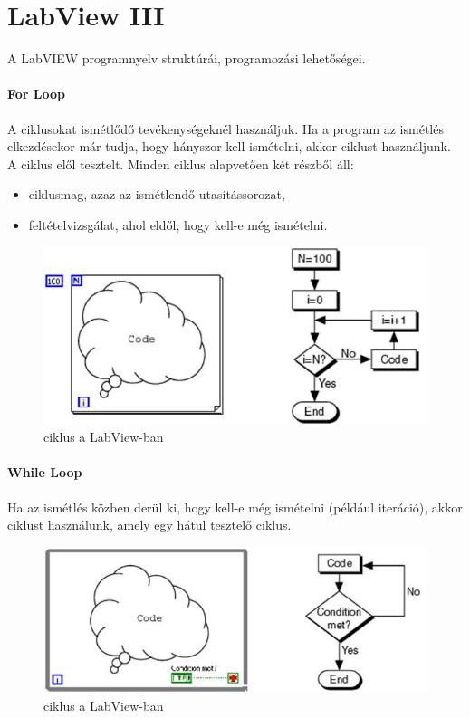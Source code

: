\documentclass[../../main.tex]{subfiles}
\begin{document}
\section{LabView III}

\begin{fulltheorem}
  A LabVIEW programnyelv struktúrái, programozási lehetőségei.
\end{fulltheorem}

\paragraph*{For Loop}
A ciklusokat ismétlődő tevékenységeknél használjuk. Ha a program az ismétlés
elkezdésekor már tudja, hogy hányszor kell ismételni, akkor  ciklust
használjunk. A  ciklus elől tesztelt. Minden ciklus alapvetően két
részből áll:
\begin{itemize}
  \item ciklusmag, azaz az ismétlendő utasítássorozat,
  \item feltételvizsgálat, ahol eldől, hogy kell-e még ismételni.
\end{itemize}
\begin{figure}[H]
  \centering
  \includegraphics[width=.6\textwidth]{../../static/lw/for-cycle.jpeg}
  \caption{ ciklus a LabView-ban}
  \label{fig:lw/for}
\end{figure}

\paragraph*{While Loop}
Ha az ismétlés közben derül ki, hogy kell-e még ismételni (például iteráció),
akkor  ciklust használunk, amely egy hátul tesztelő ciklus.
\begin{figure}[H]
  \centering
  \includegraphics[width=.6\textwidth]{../../static/lw/while-loop.jpeg}
  \caption{ ciklus a LabView-ban}
  \label{fig:lw/while}
\end{figure}
\end{document}
